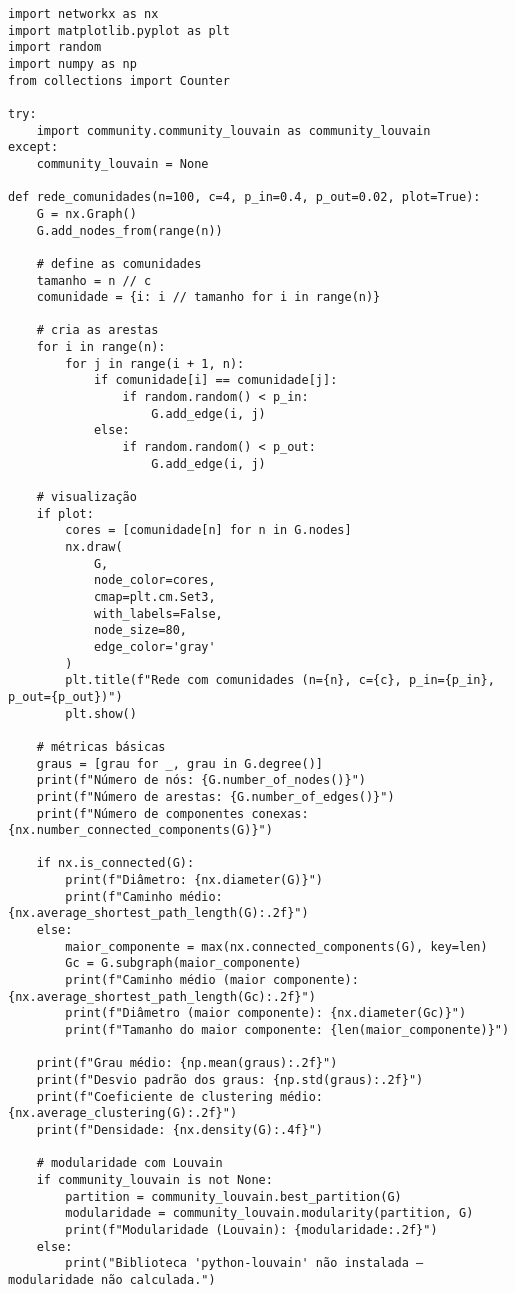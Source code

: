 \documentclass[a4paper]{article}
\begin{document}
\begin{verbatim}
import networkx as nx
import matplotlib.pyplot as plt
import random
import numpy as np
from collections import Counter

try:
    import community.community_louvain as community_louvain
except:
    community_louvain = None

def rede_comunidades(n=100, c=4, p_in=0.4, p_out=0.02, plot=True):
    G = nx.Graph()
    G.add_nodes_from(range(n))

    # define as comunidades
    tamanho = n // c
    comunidade = {i: i // tamanho for i in range(n)}

    # cria as arestas
    for i in range(n):
        for j in range(i + 1, n):
            if comunidade[i] == comunidade[j]:
                if random.random() < p_in:
                    G.add_edge(i, j)
            else:
                if random.random() < p_out:
                    G.add_edge(i, j)

    # visualização
    if plot:
        cores = [comunidade[n] for n in G.nodes]
        nx.draw(
            G,
            node_color=cores,
            cmap=plt.cm.Set3,
            with_labels=False,
            node_size=80,
            edge_color='gray'
        )
        plt.title(f"Rede com comunidades (n={n}, c={c}, p_in={p_in}, p_out={p_out})")
        plt.show()

    # métricas básicas
    graus = [grau for _, grau in G.degree()]
    print(f"Número de nós: {G.number_of_nodes()}")
    print(f"Número de arestas: {G.number_of_edges()}")
    print(f"Número de componentes conexas: {nx.number_connected_components(G)}")
    
    if nx.is_connected(G):
        print(f"Diâmetro: {nx.diameter(G)}")
        print(f"Caminho médio: {nx.average_shortest_path_length(G):.2f}")
    else:
        maior_componente = max(nx.connected_components(G), key=len)
        Gc = G.subgraph(maior_componente)
        print(f"Caminho médio (maior componente): {nx.average_shortest_path_length(Gc):.2f}")
        print(f"Diâmetro (maior componente): {nx.diameter(Gc)}")
        print(f"Tamanho do maior componente: {len(maior_componente)}")

    print(f"Grau médio: {np.mean(graus):.2f}")
    print(f"Desvio padrão dos graus: {np.std(graus):.2f}")
    print(f"Coeficiente de clustering médio: {nx.average_clustering(G):.2f}")
    print(f"Densidade: {nx.density(G):.4f}")

    # modularidade com Louvain
    if community_louvain is not None:
        partition = community_louvain.best_partition(G)
        modularidade = community_louvain.modularity(partition, G)
        print(f"Modularidade (Louvain): {modularidade:.2f}")
    else:
        print("Biblioteca 'python-louvain' não instalada – modularidade não calculada.")


\end{verbatim}
\end{document}
